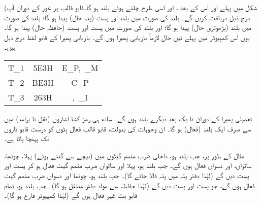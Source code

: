 (شکل   میں پہلے  اور اس کے بعد  ، اور اسی طرح چلتے ہوئے    بلند ہو گا۔قابو قالب پر غور کے دوران آپ درج ذیل دریافت کریں گے۔ بلند  کی صورت میں بلند  اور پست  (پتہ  حال)  پیدا ہو گا؛ بلند  کی صورت میں  بلند  (بڑھوتری  حال) پیدا ہو گا؛ اور بلند  کی صورت میں پست  اور پست   (حافظہ حال) پیدا ہو گا۔ یوں اس کمپیوٹر میں پہلے تین  حال لازماً  بازیابی پھیرا ہوں گے۔ بازیابی پھیرا کے قابو لفظ درج ذیل ہیں۔
\begin{center}
\begin{tabular}{CCC}
\toprule
{}&&\\
\midrule
T_1&5E3H&E_P,\, _M\\
T_2&BE3H&C_P\\
T_3&263H&,\, _I\\
\bottomrule
\end{tabular}
\end{center}

تعمیلی پھیرا کے دوران  تا  یک بعد دیگرے  بلند  ہوں گے۔ ساتھ ہی رمز کشا اشاروں (نقل تا برآمد) میں سے صرف ایک  بلند (فعال) ہو گا۔ ان وجوہات کی بدولت،  قابو قالب  فعال بِٹوں کو   درست  قابو تاروں تک پہنچا پاتا  ہے۔

مثال کے طور پر، جب بلند ہو،   داخلی ضرب متمم گیٹوں میں (نیچے سے گنتے ہوئے)   پہلا، چوتھا، ساتواں، اور دسواں فعال ہوں گے۔ جب  بلند ہو، پہلا اور ساتواں ضرب متمم  گیٹ فعال ہو کر پست  اور پست    دیں گے  (لہٰذا  دفتر پتہ میں پتہ  ڈالا جائے گا)۔ جب  بلند ہو، چوتھا اور  دسواں ضرب متمم گیٹ فعال ہوں گے، جو پست  اور  پست  دیں گے (لہٰذا حافظہ سے مواد دفتر  منتقل ہو گا)۔ جب  بلند ہو، تمام قابو بِٹ  غیر فعال ہوں گے (لہٰذا کمپیوٹر فارغ ہو گا)۔

